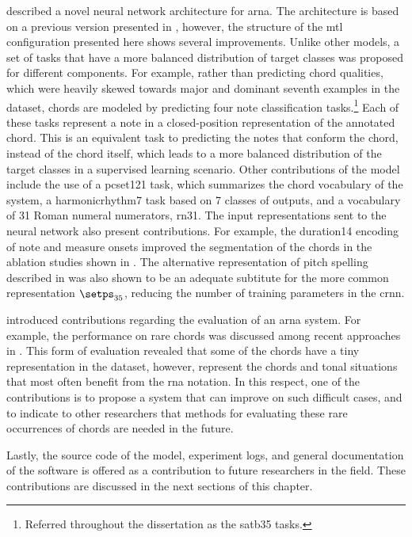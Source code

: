  described a novel neural network
architecture for \gls{arna}. The architecture is based on a
previous version presented in
\textcite{napoleslopez2021augmentednet}, however, the
structure of the \gls{mtl} configuration presented here
shows several improvements. Unlike other models, a set of
tasks that have a more balanced distribution of target
classes was proposed for different components. For example,
rather than predicting chord qualities, which were heavily
skewed towards major and dominant seventh examples in the
dataset, chords are modeled by predicting four note
classification tasks.\footnote{Referred throughout the
dissertation as the \gls{satb35} tasks.} Each of these tasks
represent a note in a \gls{closed-position} representation
of the annotated chord. This is an equivalent task to
predicting the notes that conform the chord, instead of the
chord itself, which leads to a more balanced distribution of
the target classes in a supervised learning scenario. Other
contributions of the model include the use of a
\gls{pcset121} task, which summarizes the chord vocabulary
of the system, a \gls{harmonicrhythm7} task based on 7
classes of outputs, and a vocabulary of 31 Roman numeral
numerators, \gls{rn31}. The input representations sent to
the neural network also present contributions. For example,
the \gls{duration14} encoding of note and measure onsets
improved the segmentation of the chords in the ablation
studies shown in .
The alternative representation of pitch spelling described
in  was also shown
to be an adequate subtitute for the more common
representation $\setps_{35}$, reducing the number of
training parameters in the \gls{crnn}.

 introduced contributions
regarding the evaluation of an \gls{arna} system. For
example, the performance on rare chords was discussed among
recent approaches in . This
form of evaluation revealed that some of the chords have a
tiny representation in the dataset, however, represent the
chords and tonal situations that most often benefit from the
\gls{rna} notation. In this respect, one of the
contributions is to propose a system that can improve on
such difficult cases, and to indicate to other researchers
that methods for evaluating these rare occurrences of chords
are needed in the future.

Lastly, the source code of the model, experiment logs, and
general documentation of the software is offered as a
contribution to future researchers in the field. These
contributions are discussed in the next sections of this
chapter.
